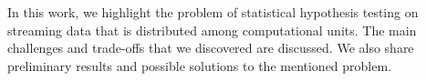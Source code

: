 In this work, we highlight the problem of statistical hypothesis testing on streaming data that is distributed among computational units. The main challenges and trade-offs that we discovered are discussed. We also share preliminary results and possible solutions to the mentioned problem.



